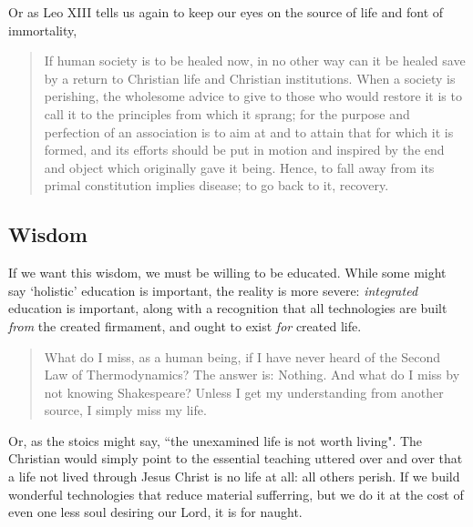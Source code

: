 \documentclass[letterpaper]{article}
\begin{document}
Or as Leo XIII tells us again to keep our eyes on the source of life and font of immortality,

\begin{quote}
  If human society is to be healed now, in no other way can it be healed save by a return to Christian life and Christian institutions. When a society is perishing, the wholesome advice to give to those who would restore it is to call it to the principles from which it sprang; for the purpose and perfection of an association is to aim at and to attain that for which it is formed, and its efforts should be put in motion and inspired by the end and object which originally gave it being. Hence, to fall away from its primal constitution implies disease; to go back to it, recovery.
\end{quote}


\subsection{Wisdom}

If we want this wisdom, we must be willing to be educated. While some might say `holistic' education is important, the reality is more severe: \textit{integrated} education is important, along with a recognition that all technologies are built \textit{from} the created firmament, and ought to exist \textit{for} created life.

\begin{quote}
What do I miss, as a human being, if I have never heard of the Second Law of Thermodynamics? The answer is: Nothing. And what do I miss by not knowing Shakespeare? Unless I get my understanding from another source, I simply miss my life.
\end{quote}

Or, as the stoics might say, ``the unexamined life is not worth living". The Christian would simply point to the essential teaching uttered over and over that a life not lived through Jesus Christ is no life at all: all others perish. If we build wonderful technologies that reduce material sufferring, but we do it at the cost of even one less soul desiring our Lord, it is for naught.

\iffalse
Indeed to harken back to Eden,

\begin{quote}
  Sorrow is knowledge; they who know the most

  Must mourn the deepest o'er the fatal truth,

  The Tree of Knowledge is not that of Life.
  \attrib{\textit{Manfred}, George Gordon Byron 1817}
\end{quote}
\fi
\end{document}
